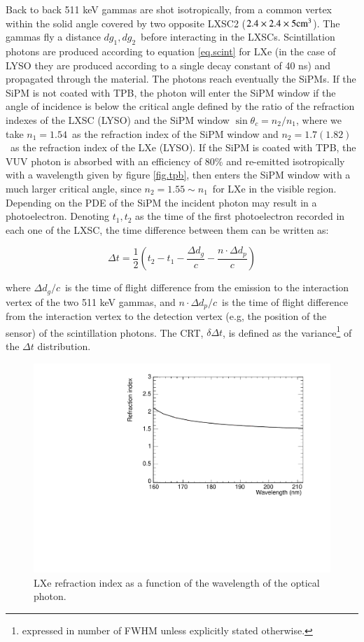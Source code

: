 \documentclass[review]{elsarticle}
\begin{document}
  Back to back 511 keV gammas are shot isotropically, from a common vertex within the solid angle covered by two opposite LXSC2 ($2.4 \times 2.4 \times 5 {\rm cm^3}$). The gammas fly a distance $dg_1, dg_2$~before interacting in the LXSCs. Scintillation photons are produced according to equation \ref{eq.scint} for LXe (in the case of LYSO they are produced according to a single decay constant of 40 ns) and propagated through the material. The photons reach eventually the SiPMs. If the SiPM is not coated with TPB, the photon will enter the SiPM window if the angle of incidence is below the critical angle defined by the ratio of the refraction indexes of the LXSC (LYSO) and the SiPM window $\sin \theta_c = n_2/n_1$,  where we take $n_1 = 1.54$~as the refraction index of the SiPM window and
  $n_2 = 1.7 (1.82)$~as the refraction index of the LXe (LYSO). If the SiPM is coated with TPB, the 
  VUV photon is absorbed with an efficiency of 80\% and re-emitted isotropically with a wavelength given by figure \ref{fig.tpb}, then enters the SiPM window with a much larger critical angle, since  $n_2 = 1.55 \sim n_1$~for LXe in the visible region. Depending on the PDE of the SiPM the incident photon may result in a photoelectron. Denoting $t_1,t_2$ as the time of the first photoelectron recorded in each one of the LXSC, the time difference between them can be written as:

\begin{equation}
\Delta t = \frac{1}{2}(t_2 - t_1 - \frac{\Delta d_g}{c} - \frac{n \cdot \Delta d_p}{c}) 
\label{eq.CRT}
\end{equation}
%

where $\Delta d_g/c$~is the time of flight difference from the emission to the interaction vertex of the two 511 keV gammas, and $n \cdot \Delta d_p/c$~is the time of flight difference from the interaction vertex to the
detection vertex (e.g, the position of the sensor) of the scintillation photons. The CRT,
$\delta \Delta t$, is defined as the variance\footnote{expressed in number of FWHM unless explicitly stated otherwise.} of the $\Delta t$ distribution. 

\begin{figure}[!bhtp]
	\centering
	\includegraphics[scale=0.6]{../img/LXe_n_lambda.pdf}
	\caption{\label{fig.nlambda} LXe refraction index as a function of the wavelength of the optical photon.}
\end{figure}
\end{document}
